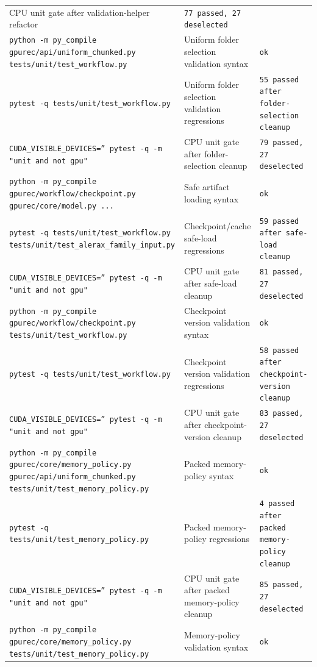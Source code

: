 \documentclass[11pt]{article}
\begin{document}
\begin{center}
\begin{tabular}{lll}
CPU unit gate after validation-helper refactor &
\texttt{77 passed, 27 deselected} \\
\texttt{python -m py\_compile gpurec/api/uniform\_chunked.py tests/unit/test\_workflow.py} &
Uniform folder selection validation syntax &
\texttt{ok} \\
\texttt{pytest -q tests/unit/test\_workflow.py} &
Uniform folder selection validation regressions &
\texttt{55 passed after folder-selection cleanup} \\
\texttt{CUDA\_VISIBLE\_DEVICES='' pytest -q -m "unit and not gpu"} &
CPU unit gate after folder-selection cleanup &
\texttt{79 passed, 27 deselected} \\
\texttt{python -m py\_compile gpurec/workflow/checkpoint.py gpurec/core/model.py ...} &
Safe artifact loading syntax &
\texttt{ok} \\
\texttt{pytest -q tests/unit/test\_workflow.py tests/unit/test\_alerax\_family\_input.py} &
Checkpoint/cache safe-load regressions &
\texttt{59 passed after safe-load cleanup} \\
\texttt{CUDA\_VISIBLE\_DEVICES='' pytest -q -m "unit and not gpu"} &
CPU unit gate after safe-load cleanup &
\texttt{81 passed, 27 deselected} \\
\texttt{python -m py\_compile gpurec/workflow/checkpoint.py tests/unit/test\_workflow.py} &
Checkpoint version validation syntax &
\texttt{ok} \\
\texttt{pytest -q tests/unit/test\_workflow.py} &
Checkpoint version validation regressions &
\texttt{58 passed after checkpoint-version cleanup} \\
\texttt{CUDA\_VISIBLE\_DEVICES='' pytest -q -m "unit and not gpu"} &
CPU unit gate after checkpoint-version cleanup &
\texttt{83 passed, 27 deselected} \\
\texttt{python -m py\_compile gpurec/core/memory\_policy.py gpurec/api/uniform\_chunked.py tests/unit/test\_memory\_policy.py} &
Packed memory-policy syntax &
\texttt{ok} \\
\texttt{pytest -q tests/unit/test\_memory\_policy.py} &
Packed memory-policy regressions &
\texttt{4 passed after packed memory-policy cleanup} \\
\texttt{CUDA\_VISIBLE\_DEVICES='' pytest -q -m "unit and not gpu"} &
CPU unit gate after packed memory-policy cleanup &
\texttt{85 passed, 27 deselected} \\
\texttt{python -m py\_compile gpurec/core/memory\_policy.py tests/unit/test\_memory\_policy.py} &
Memory-policy validation syntax &
\texttt{ok} \\

\end{tabular}
\end{center}
\end{document}
